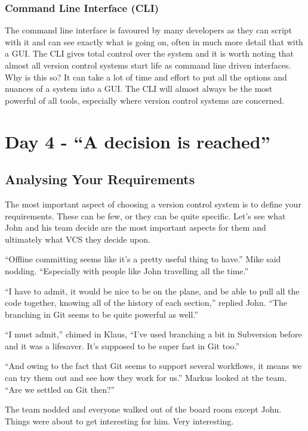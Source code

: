 \subsubsection{Command Line Interface (CLI)}
The command line interface is favoured by many developers as they can script with it and can see exactly what is going on, often in much more detail that with a GUI.
The CLI gives total control over the system and it is worth noting that almost all version control systems start life as command line driven interfaces.
Why is this so? It can take a lot of time and effort to put all the options and nuances of a system into a GUI.
The CLI will almost always be the most powerful of all tools, especially where version control systems are concerned.

\section{Day 4 - ``A decision is reached''}
\subsection{Analysing Your Requirements}
The most important aspect of choosing a version control system is to define your requirements.
These can be few, or they can be quite specific. Let's see what John and his team decide are the most important aspects for them and ultimately what VCS they decide upon.

\begin{trenches}
``Offline committing seems like it's a pretty useful thing to have.'' Mike said nodding.
``Especially with people like John travelling all the time.''

``I have to admit, it would be nice to be on the plane, and be able to pull all the code together, knowing all of the history of each section,'' replied John.
``The branching in Git seems to be quite powerful as well.''

``I must admit,'' chimed in Klaus, ``I've used branching a bit in Subversion before and it was a lifesaver.
It's supposed to be super fast in Git too.''

``And owing to the fact that Git seems to support several workflows, it means we can try them out and see how they work for us.'' Markus looked at the team.
``Are we settled on Git then?''

The team nodded and everyone walked out of the board room except John.
Things were about to get interesting for him.
Very interesting.
\end{trenches}

